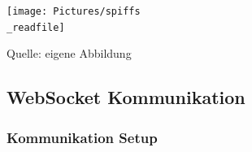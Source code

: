 \documentclass[ngerman,12pt,a4paper]{article}
\begin{document}
	\begin{center}
		\begin{minipage}[t]{0.75\textwidth}
			\texttt{[image: Pictures/spiffs\\\_readfile]}
			\label{fig:spiffs_readfile}
			\vspace{-10pt}
			\begin{center}
				\par\small Quelle: eigene Abbildung
			\end{center}
		\end{minipage}
	\end{center}

	
		\subsection{WebSocket Kommunikation}
		
			\subsubsection{Kommunikation Setup}	
			
\end{document}
